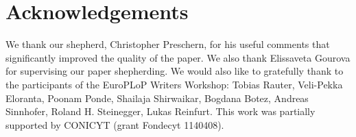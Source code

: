 \documentclass[]{acmlarge}
\begin{document}
\section{Acknowledgements}
We thank our shepherd, Christopher Preschern, for his useful comments that significantly improved the quality of the paper. We also thank Elissaveta Gourova for supervising our paper shepherding. We
would also like to gratefully thank to the participants of the EuroPLoP Writers Workshop: Tobias Rauter, Veli-Pekka Eloranta, Poonam Ponde, Shailaja Shirwaikar, Bogdana Botez, Andreas Sinnhofer, Roland H. Steinegger, Lukas Reinfurt. This work was partially supported by CONICYT (grant Fondecyt 1140408).






  
\end{document}
